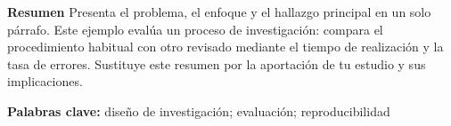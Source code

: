 \textbf{Resumen}\quad
Presenta el problema, el enfoque y el hallazgo principal en un solo párrafo.
Este ejemplo evalúa un proceso de investigación: compara el procedimiento habitual
con otro revisado mediante el tiempo de realización y la tasa de errores.
Sustituye este resumen por la aportación de tu estudio y sus implicaciones.

{\small\textbf{Palabras clave:} diseño de investigación; evaluación; reproducibilidad}
